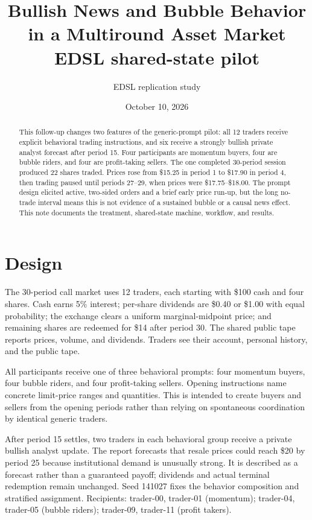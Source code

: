 \documentclass[11pt]{article}
\title{Bullish News and Bubble Behavior in a Multiround Asset Market\\\large EDSL shared-state pilot}
\author{EDSL replication study}
\date{October 10, 2026}
\begin{document}
\maketitle

\begin{abstract}
This follow-up changes two features of the generic-prompt pilot: all 12 traders
receive explicit behavioral trading instructions, and six receive a strongly
bullish private analyst forecast after period 15. Four participants are
momentum buyers, four are bubble riders, and four are profit-taking sellers.
The one completed 30-period session produced 22 shares traded. Prices rose from
\$15.25 in period 1 to \$17.90 in period 4, then trading paused until periods
27--29, when prices were \$17.75--\$18.00. The prompt design elicited active,
two-sided orders and a brief early price run-up, but the long no-trade interval
means this is not evidence of a sustained bubble or a causal news effect. This
note documents the treatment, shared-state machine, workflow, and results.
\end{abstract}

\section{Design}
The 30-period call market uses 12 traders, each starting with \$100 cash and
four shares. Cash earns 5\% interest; per-share dividends are \$0.40 or \$1.00
with equal probability; the exchange clears a uniform marginal-midpoint price;
and remaining shares are redeemed for \$14 after period 30. The shared public
tape reports prices, volume, and dividends. Traders see their account, personal
history, and the public tape.

All participants receive one of three behavioral prompts: four momentum buyers,
four bubble riders, and four profit-taking sellers. Opening instructions name
concrete limit-price ranges and quantities. This is intended to create buyers
and sellers from the opening periods rather than relying on spontaneous
coordination by identical generic traders.

After period 15 settles, two traders in each behavioral group receive a
private bullish analyst update. The report forecasts that resale prices could
reach \$20 by period 25 because institutional demand is unusually strong. It is
described as a forecast rather than a guaranteed payoff; dividends and actual
terminal redemption remain unchanged. Seed 141027 fixes the behavior composition
and stratified assignment. Recipients: trader-00, trader-01 (momentum);
trader-04, trader-05 (bubble riders); trader-09, trader-11 (profit takers).
\end{document}
